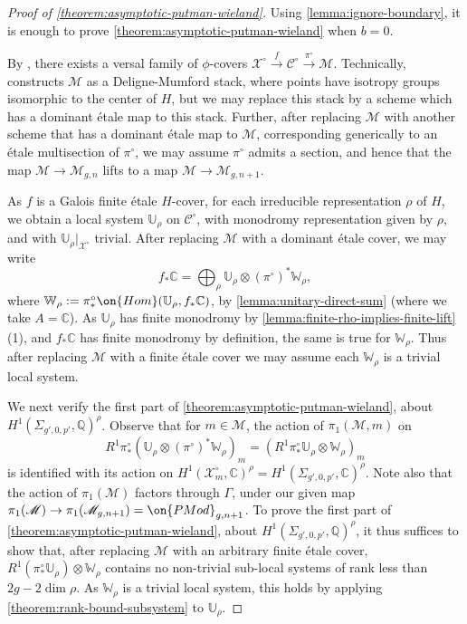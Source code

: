 \documentclass[12 pt]{amsart}
\theoremstyle{plain}
\theoremstyle{definition}
\theoremstyle{remark}
\numberwithin{equation}{section}
\begin{document}
\begin{proof}[Proof of \autoref{theorem:asymptotic-putman-wieland}]
	Using \autoref{lemma:ignore-boundary}, 
	it is enough to prove
	\autoref{theorem:asymptotic-putman-wieland}
	when $b =0$. 

	By \cite[Theorem 4]{wewers:thesis}, there exists a versal family of
	$\phi$-covers $\mathscr X^\circ \xrightarrow{f} \mathscr C^\circ
	\xrightarrow{\pi^\circ} \mathscr M$.
	Technically, 
	\cite[Theorem 4]{wewers:thesis} constructs $\mathscr M$ as a Deligne-Mumford stack,
	where points have isotropy groups isomorphic to the center of $H$,	
	but we may replace this stack by
	a scheme which has a dominant \'etale map to this stack. 
	Further, after replacing $\mathscr M$ with another scheme that has a dominant \'etale map
	to $\mathscr M$, corresponding generically to an \'etale multisection of $\pi^\circ$, we may assume $\pi^\circ$ admits a section, and hence that the map $\mathscr{M}\to \mathscr{M}_{g,n}$ lifts to a map $\mathscr{M}\to \mathscr{M}_{g,n+1}$.

	As $f$ is a Galois finite \'etale $H$-cover, for each irreducible
	representation $\rho$ of $H$, we obtain a local system $\mathbb{U}_\rho$
	on $\mathscr{C}^\circ$, with monodromy representation given by $\rho$,
	and with $\mathbb{U}_\rho|_{\mathscr{X}^\circ}$ trivial. After replacing $\mathscr{M}$ with a dominant \'etale cover, we may write
	$$f_*\mathbb{C}=\bigoplus_\rho \mathbb{U}_\rho\otimes
	(\pi^\circ)^*\mathbb{W}_\rho,$$ where
	$\mathbb{W}_\rho:=\pi^\circ_*\on{Hom}(\mathbb{U}_\rho, f_*\mathbb{C})$,
	by \autoref{lemma:unitary-direct-sum} (where we take $A=\mathbb{C}$). 
	As
	$\mathbb{U}_\rho$ has finite monodromy by
	\autoref{lemma:finite-rho-implies-finite-lift}(1), and $f_*\mathbb{C}$
	has finite monodromy by definition, the same is true for
	$\mathbb{W}_\rho$. Thus after replacing $\mathscr{M}$ with a finite \'etale cover we may assume each
	$\mathbb{W}_\rho$ is a trivial local system.
	
	We next verify the first part of
	\autoref{theorem:asymptotic-putman-wieland}, about $H^1(\Sigma_{g', 0,
	p'}, \mathbb{Q})^\rho$.
	Observe that for $m\in \mathscr{M}$, the action of $\pi_1(\mathscr{M},
	m)$ on $$R^1\pi^\circ_*( \mathbb{U}_\rho\otimes
	(\pi^\circ)^*\mathbb{W}_\rho)_m=(R^1\pi^\circ_* \mathbb{U}_\rho\otimes
	\mathbb{W}_\rho)_m$$ is identified with its action on
	$H^1(\mathscr{X}^\circ_m, \mathbb{C})^\rho=H^1(\Sigma_{g', 0, p'},
	\mathbb{C})^\rho$. 
	Note also that the action of
	$\pi_1(\mathscr{M})$ factors through $\Gamma$, 
	under our given map $\pi_1(\mathscr{M})\to \pi_1(\mathscr{M}_{g,n+1})=\on{PMod}_{g,n+1}$.
	To prove the first part of
	\autoref{theorem:asymptotic-putman-wieland}, about $H^1(\Sigma_{g', 0,
	p'}, \mathbb{Q})^\rho$, it thus suffices to show that, after replacing
	$\mathscr{M}$ with an arbitrary finite \'etale cover, $R^1(\pi^\circ_*
	\mathbb{U}_\rho)\otimes \mathbb{W}_\rho$ contains no non-trivial
	sub-local systems of rank less than $2g-2\dim\rho$. 
	As $\mathbb{W}_\rho$
	is a trivial local system, this holds by applying
	\autoref{theorem:rank-bound-subsystem} to $\mathbb{U}_\rho$.


\end{proof}
\end{document}
